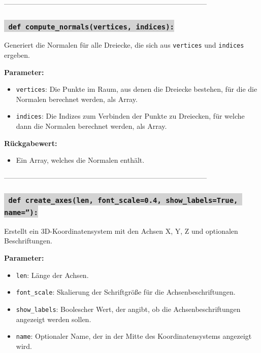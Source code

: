--------------------------------------------------------------------------------------


\subsubsection*{\colorbox{lightgray}{\texttt{\textbf{\color{green} def} \color{blue} compute\_normals}\textbf{\texttt{(vertices, indices):}}}}
Generiert die Normalen für alle Dreiecke, die sich aus \texttt{vertices} und \texttt{indices} ergeben.

\noindent \textbf{Parameter:} \vspace{-6ex} \\
\begin{itemize}
    \setlength{\itemindent}{1em}
    \item \texttt{vertices}: Die Punkte im Raum, aus denen die Dreiecke bestehen, für die die Normalen berechnet werden, als Array.
    \item \texttt{indices}: Die Indizes zum Verbinden der Punkte zu Dreiecken, für welche dann die Normalen berechnet werden, als Array.
\end{itemize}

\noindent \textbf{Rückgabewert:} \vspace{-6ex} \\
\begin{itemize}
    \setlength{\itemindent}{1em}
    \item Ein Array, welches die Normalen enthält.
\end{itemize}

--------------------------------------------------------------------------------------


\subsubsection*{\colorbox{lightgray}{\texttt{\textbf{\color{green} def} \color{blue} create\_axes}\textbf{\texttt{(len, font\_scale=0.4, show\_labels=True, name=''):}}}}
Erstellt ein 3D-Koordinatensystem mit den Achsen X, Y, Z und optionalen Beschriftungen.

\noindent \textbf{Parameter:} \vspace{-6ex} \\
\begin{itemize}
    \setlength{\itemindent}{1em}
    \item \texttt{len}: Länge der Achsen.
    \item \texttt{font\_scale}: Skalierung der Schriftgröße für die Achsenbeschriftungen.
    \item \texttt{show\_labels}: Boolescher Wert, der angibt, ob die Achsenbeschriftungen angezeigt werden sollen.
    \item \texttt{name}: Optionaler Name, der in der Mitte des Koordinatensystems angezeigt wird.
\end{itemize}

